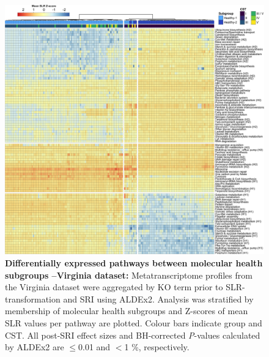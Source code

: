 \documentclass[sn-mathphys,Numbered]{sn-jnl}%
\begin{document}
\begin{figure}[H]
    \centering
    \includegraphics[scale = 0.77]{0_supplFig11.png}
    \caption{\textbf{Differentially expressed pathways between molecular health subgroups --Virginia dataset:} Metatranscriptome profiles from the Virginia dataset were aggregated by KO term prior to SLR-transformation and SRI using ALDEx2. Analysis was stratified by membership of molecular health subgroups and Z-scores of mean SLR values per pathway are plotted. Colour bars indicate group and CST. All post-SRI effect sizes and BH-corrected \textit{P}-values calculated by ALDEx2 are $\leq$0.01 and $<$1 \%, respectively.} \label{fig:sfigVirgHsubgroups}
\end{figure}
\newpage

\end{document}
